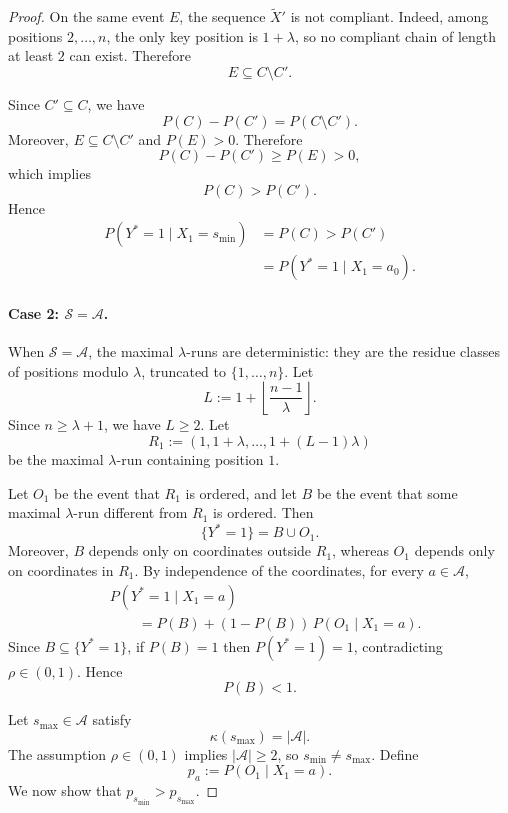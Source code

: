\documentclass{article} %
\theoremstyle{plain}
\theoremstyle{definition}
\theoremstyle{remark}
\begin{document}
\begin{proof}
On the same event $E$, the sequence $\widetilde X'$ is not compliant.
Indeed, among positions $2,\ldots,n$, the only key position is $1+\lambda$,
so no compliant chain of length at least $2$ can exist. Therefore
\[
E \subseteq C\setminus C'.
\]

Since \(C' \subseteq C\), we have
\[
P(C)-P(C') = P(C\setminus C').
\]
Moreover, \(E \subseteq C\setminus C'\) and \(P(E)>0\). Therefore
\[
P(C)-P(C') \ge P(E) > 0,
\]
which implies
\[
P(C) > P(C').
\]
Hence
\[
\begin{aligned}
P(Y^*=1 \mid X_1=s_{\min})
&=
P(C)
>
P(C')\\
&=
P(Y^*=1 \mid X_1=a_0).
\end{aligned}
\]

\paragraph{Case 2: $\mathcal{S}=\mathcal{A}$.}
When $\mathcal{S}=\mathcal{A}$, the maximal $\lambda$-runs are deterministic:
they are the residue classes of positions modulo $\lambda$, truncated to
$\{1,\ldots,n\}$. Let
\[
L := 1+\left\lfloor \frac{n-1}{\lambda}\right\rfloor .
\]
Since $n\geq \lambda+1$, we have $L\geq 2$. Let
\[
R_1 := (1,1+\lambda,\ldots,1+(L-1)\lambda)
\]
be the maximal $\lambda$-run containing position $1$.

Let $O_1$ be the event that $R_1$ is ordered, and let $B$ be the event that
some maximal $\lambda$-run different from $R_1$ is ordered. Then
\[
\{Y^*=1\}=B\cup O_1.
\]
Moreover, $B$ depends only on coordinates outside $R_1$, whereas $O_1$
depends only on coordinates in $R_1$. By independence of the coordinates,
for every $a\in\mathcal{A}$,
\[
\begin{aligned}
&P(Y^*=1\mid X_1=a)\\
&\qquad=
P(B)+(1-P(B))\,P(O_1\mid X_1=a).
\end{aligned}
\]
Since $B\subseteq\{Y^*=1\}$, if $P(B)=1$ then $P(Y^*=1)=1$, contradicting
$\rho\in(0,1)$. Hence
\[
P(B)<1.
\]

Let $s_{\max}\in\mathcal{A}$ satisfy
\[
\kappa(s_{\max})=|\mathcal{A}|.
\]
The assumption $\rho\in(0,1)$ implies $|\mathcal{A}|\geq 2$, so
$s_{\min}\neq s_{\max}$. Define
\[
p_a := P(O_1\mid X_1=a).
\]
We now show that $p_{s_{\min}}>p_{s_{\max}}$.


\end{proof}
\end{document}
